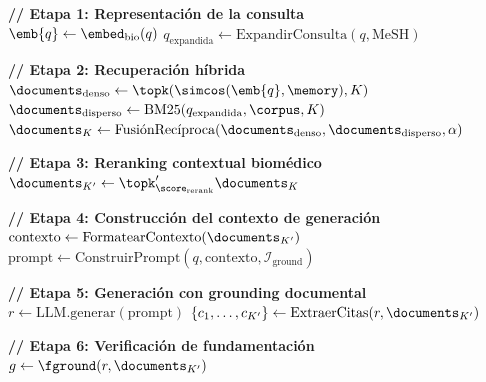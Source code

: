 
\begin{algorithm}[!t]
\SetAlgoLined
{}

\BlankLine
\textbf{// Etapa 1: Representación de la consulta}\\
$\emb{q} \leftarrow \embed_{\text{bio}}(q)$\;
$q_{\text{expandida}} \leftarrow \text{ExpandirConsulta}(q, \text{MeSH})$\;

\BlankLine
\textbf{// Etapa 2: Recuperación híbrida}\\
$\documents_{\text{denso}} \leftarrow \topk(\simcos(\emb{q}, \memory), K)$\;
$\documents_{\text{disperso}} \leftarrow \text{BM25}(q_{\text{expandida}}, \corpus, K)$\;
$\documents_K \leftarrow \text{FusiónRecíproca}(\documents_{\text{denso}}, \documents_{\text{disperso}}, \alpha)$\;

\BlankLine
\textbf{// Etapa 3: Reranking contextual biomédico}\\
$\documents_{K'} \leftarrow \topk'_{\score_{\text{rerank}}} \documents_K$\;

\BlankLine
\textbf{// Etapa 4: Construcción del contexto de generación}\\
$\text{contexto} \leftarrow \text{FormatearContexto}(\documents_{K'})$\;
$\text{prompt} \leftarrow \text{ConstruirPrompt}(q, \text{contexto}, \mathcal{I}_{\text{ground}})$\;

\BlankLine
\textbf{// Etapa 5: Generación con grounding documental}\\
$r \leftarrow \text{LLM}.\text{generar}(\text{prompt})$\;
$\{c_1, \ldots, c_{K'}\} \leftarrow \text{ExtraerCitas}(r, \documents_{K'})$\;

\BlankLine
\textbf{// Etapa 6: Verificación de fundamentación}\\
$g \leftarrow \fground(r, \documents_{K'})$\;

\;

\caption{Pipeline RAG contextual biomédico de \sirca{}}
\label{alg:rag_pipeline}
\end{algorithm}
